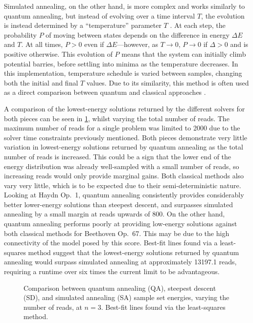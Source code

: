 \documentclass[12pt]{article}
\theoremstyle{definition}
\begin{document}
Simulated annealing, on the other hand, is more complex and works similarly to quantum annealing, but instead of evolving over a time interval $T$, the evolution is instead determined by a ``temperature'' parameter $T$ \cite{kirkpatrick_optimization_1983}. At each step, the probability $P$ of moving between states depends on the difference in energy $\Delta E$ and $T$. At all times, $P>0$ even if $\Delta E$---however, as $T\to 0$, $P\to0$ if $\Delta>0$ and is positive otherwise. This evolution of $P$ means that the system can initially climb potential barries, before settling into minima as the temperature decreases. In this implementation, temperature schedule is varied between samples, changing both the initial and final $T$ values. Due to its similarity, this method is often used as a direct comparison between quantum and classical approaches \cite{albash_demonstration_2018}.

A comparison of the lowest-energy solutions returned by the different solvers for both pieces can be seen in \cref{fig:reads}, whilst varying the total number of reads. The maximum number of reads for a single problem was limited to \num{2000} due to the solver time constraints previously mentioned. Both pieces demonstrate very little variation in lowest-energy solutions returned by quantum annealing as the total number of reads is increased. This could be a sign that the lower end of the energy distribution was already well-sampled with a small number of reads, so increasing reads would only provide marginal gains. Both classical methods also vary very little, which is to be expected due to their semi-deterministic nature.
Looking at Haydn Op.\ 1, quantum annealing consistently provides considerably better lower-energy solutions than steepest descent, and surpasses simulated annealing by a small margin at reads upwards of \num{800}.
On the other hand, quantum annealing performs poorly at providing low-energy solutions against both classical methods for Beethoven Op.\ 67. This may be due to the high connectivity of the model posed by this score. Best-fit lines found via a least-squares method suggest that the lowest-energy solutions returned by quantum annealing would surpass simulated annealing at approximately \num{13197.1} reads, requiring a runtime over six times the current limit to be advantageous.

\begin{figure}[ht]
    \centering\footnotesize
    
    \caption{Comparison between quantum annealing (QA), steepest descent (SD), and simulated annealing (SA) sample set energies, varying the number of reads, at $n=3$. Best-fit lines found via the least-squares method.}
    \label{fig:reads}
\end{figure}
\end{document}
